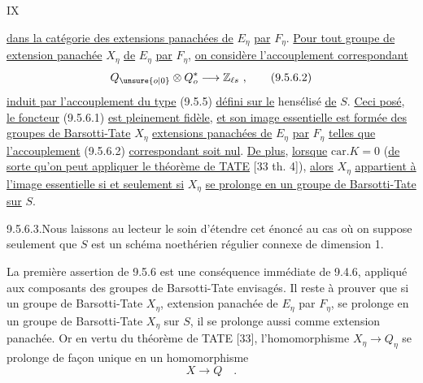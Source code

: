 \hfill IX

\uline{dans la catégorie des extensions panachées de} $E_\eta$ \uline{par} $F_\eta$. \uline{Pour tout groupe de  extension panachée} $X_\eta$ \uline{de} $E_\eta$ \uline{par} $F_\eta$, \uline{on considère l'accouplement correspondant}
\[
 Q_{\unsure{o|0}}\otimes Q_o^*\longrightarrow\mathbb Z_{\ell s}\ , \tag*{(9.5.6.2)}
\]
\uline{induit par l'accouplement du type} (9.5.5) \uline{défini sur le} hensélisé \uline{de} $S$. \uline{Ceci posé}, \uline{le foncteur} (9.5.6.1) \uline{est pleinement fidèle}, \uline{et son image essentielle est formée des groupes de Barsotti-Tate} $X_\eta$ \uline{extensions panachées de} $E_\eta$ \uline{par} $F_\eta$ \uline{telles que l'accouplement} (9.5.6.2) \uline{correspondant soit nul}. \uline{De plus}, \uline{lorsque} $\mathrm{car}.K=0$ (\uline{de sorte qu'on peut appliquer le théorème de TATE} [33 th. 4]), \uline{alors} $X_\eta$ \uline{appartient à l'image essentielle si et seulement si} $X_\eta$ \uline{se prolonge en un groupe de Barsotti-Tate sur} $S$.

9.5.6.3.\quad Nous laissons au lecteur le soin d'étendre cet énoncé au cas où on suppose seulement que $S$ est un schéma noethérien régulier connexe de dimension 1.

La première assertion de 9.5.6 est une conséquence immédiate de 9.4.6, appliqué aux composants des groupes de Barsotti-Tate envisagés. Il reste à prouver que si un groupe de Barsotti-Tate $X_\eta$, extension panachée de $E_\eta$ par $F_\eta$, se prolonge en un groupe de Barsotti-Tate $X_\eta$ sur $S$, il se prolonge aussi comme extension panachée. Or en vertu du théorème de TATE [33], l'homomorphisme $X_\eta\longrightarrow Q_\eta$ se prolonge de façon unique en un homomorphisme
\[
 X\longrightarrow Q\quad .
\]
